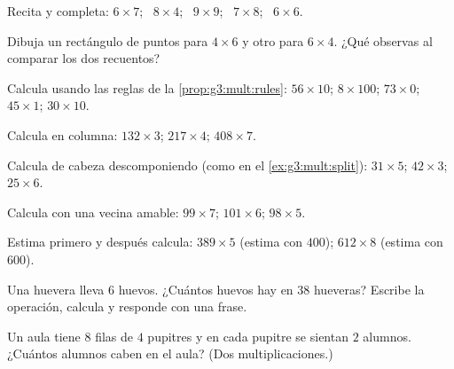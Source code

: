 \begin{exercise}[$\star$]\label{exo:g3:mult:2}
Recita y completa: $6 \times 7$; \ $8 \times 4$; \ $9 \times 9$;
\ $7 \times 8$; \ $6 \times 6$.
\end{exercise}

\begin{exercise}[$\star$]\label{exo:g3:mult:3}
Dibuja un rectángulo de puntos para $4 \times 6$ y otro para $6 \times 4$.
¿Qué observas al comparar los dos recuentos?
\end{exercise}

\begin{exercise}[$\star$]\label{exo:g3:mult:4}
Calcula usando las reglas de la \cref{prop:g3:mult:rules}:
$56 \times 10$; \quad $8 \times 100$; \quad $73 \times 0$; \quad
$45 \times 1$; \quad $30 \times 10$.
\end{exercise}

\begin{exercise}[$\star$]\label{exo:g3:mult:5}
Calcula en columna: $132 \times 3$; \quad $217 \times 4$; \quad
$408 \times 7$.
\end{exercise}

\begin{exercise}[$\star$]\label{exo:g3:mult:6}
Calcula de cabeza descomponiendo (como en el \cref{ex:g3:mult:split}):
$31 \times 5$; \quad $42 \times 3$; \quad $25 \times 6$.
\end{exercise}

\begin{exercise}[$\star$]\label{exo:g3:mult:7}
Calcula con una vecina amable: $99 \times 7$; \quad
$101 \times 6$; \quad $98 \times 5$.
\end{exercise}

\begin{exercise}[$\star$]\label{exo:g3:mult:8}
Estima primero y después calcula: $389 \times 5$ (estima con $400$);
$612 \times 8$ (estima con $600$).
\end{exercise}

\begin{exercise}[$\star$]\label{exo:g3:mult:9}
Una huevera lleva $6$ huevos. ¿Cuántos huevos hay en $38$ hueveras? Escribe
la operación, calcula y responde con una frase.
\end{exercise}

\begin{exercise}[$\star\star$]\label{exo:g3:mult:10}
Un aula tiene $8$ filas de $4$ pupitres y en cada pupitre se sientan $2$ alumnos.
¿Cuántos alumnos caben en el aula? (Dos multiplicaciones.)
\end{exercise}

